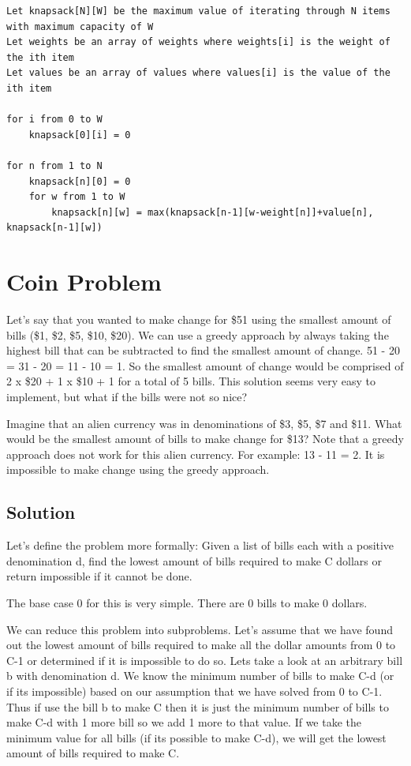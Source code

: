 \documentclass[11pt,oneside]{book}
\begin{document}
\begin{lstlisting}
Let knapsack[N][W] be the maximum value of iterating through N items with maximum capacity of W
Let weights be an array of weights where weights[i] is the weight of the ith item
Let values be an array of values where values[i] is the value of the ith item

for i from 0 to W
    knapsack[0][i] = 0

for n from 1 to N
    knapsack[n][0] = 0
    for w from 1 to W
        knapsack[n][w] = max(knapsack[n-1][w-weight[n]]+value[n], knapsack[n-1][w])
\end{lstlisting}
\section{Coin Problem}

Let's say that you wanted to make change for \$51 using the smallest amount of bills (\$1, \$2, \$5, \$10, \$20). We can use a greedy approach by always taking the highest bill that can be subtracted to find the smallest amount of change. 51 - 20 = 31 - 20 = 11 - 10 = 1. So the smallest amount of change would be comprised of 2 x \$20 + 1 x \$10 + 1 for a total of 5 bills. This solution seems very easy to implement, but what if the bills were not so nice?

Imagine that an alien currency was in denominations of \$3, \$5, \$7 and \$11. What would be the smallest amount of bills to make change for \$13? Note that a greedy approach does not work for this alien currency. For example: 13 - 11 = 2. It is impossible to make change using the greedy approach.

\subsection{Solution}

Let's define the problem more formally: Given a list of bills each with a positive denomination d, find the lowest amount of bills required to make C dollars or return impossible if it cannot be done.

The base case 0 for this is very simple. There are 0 bills to make 0 dollars.

We can reduce this problem into subproblems. Let's assume that we have found out the lowest amount of bills required to make all the dollar amounts from 0 to C-1 or determined if it is impossible to do so. Lets take a look at an arbitrary bill b with denomination d. We know the minimum number of bills to make C-d (or if its impossible) based on our assumption that we have solved from 0 to C-1. Thus if use the bill b to make C then it is just the minimum number of bills to make C-d with 1 more bill so we add 1 more to that value. If we take the minimum value for all bills (if its possible to make C-d), we will get the lowest amount of bills required to make C.
\end{document}
